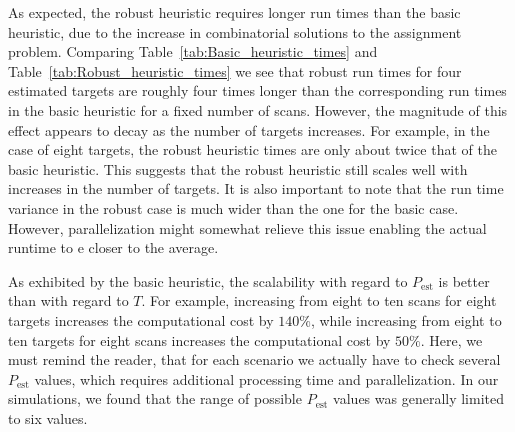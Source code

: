 As expected, the robust heuristic requires longer run times than the basic heuristic, due to the increase in combinatorial solutions to the assignment problem. Comparing Table~\ref{tab:Basic_heuristic_times} and Table~\ref{tab:Robust_heuristic_times} we see that robust run times for four estimated targets are roughly four times longer than the corresponding run times in the basic heuristic for a fixed number of scans. However, the magnitude of this effect appears to decay as the number of targets increases. For example, in the case of eight targets, the robust heuristic times are only about twice that of the basic heuristic. This suggests that the robust heuristic still scales well with increases in the number of targets. It is also important to note that the run time variance in the robust case is much wider than the one for the basic case. However, parallelization might somewhat relieve this issue enabling the actual runtime to e closer to the average.

As exhibited by the basic heuristic, the scalability with regard to $P_{\text{est}}$ is better than with regard to $T$. For example, increasing from eight to ten scans for eight targets increases the computational cost by $140\%$, while increasing from eight to ten targets for eight scans increases the computational cost by $50\%$. Here, we must remind the reader, that for each scenario we actually have to check several $P_{\text{est}}$ values, which requires additional processing time and parallelization. In our simulations, we found that the range of possible $P_{\text{est}}$ values was generally limited to six values. 

